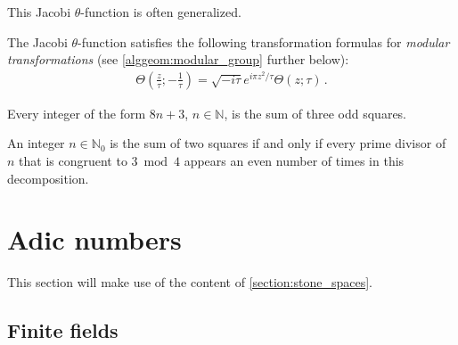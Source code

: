     This Jacobi $\theta$-function is often generalized.

    \begin{property}
        The Jacobi $\theta$-function satisfies the following transformation formulas for \textit{modular transformations} (see \cref{alggeom:modular_group} further below):
        \begin{gather}
            \Theta\left(\frac{z}{\tau};-\frac{1}{\tau}\right) = \sqrt{-i\tau}e^{i\pi z^2/\tau}\Theta(z;\tau)\,.
        \end{gather}
    \end{property}

    \begin{theorem}[Gauss]
        Every integer of the form $8n+3$, $n\in\mathbb{N}$, is the sum of three odd squares.
    \end{theorem}

    \begin{theorem}[Fermat]
        An integer $n\in\mathbb{N}_0$ is the sum of two squares if and only if every prime divisor of $n$ that is congruent to $3\bmod 4$ appears an even number of times in this decomposition.
    \end{theorem}

\section{Adic numbers}

    This section will make use of the content of \cref{section:stone_spaces}.

\subsection{Finite fields}

